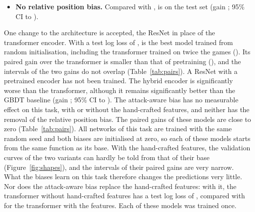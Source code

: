 \documentclass[11pt]{article}
\begin{document}
\begin{itemize}
 on the test
set (gain ; 95\% CI
 to
), and the
modification is
.
\fi
\ifchangegeometry
\item \textbf{No relative position bias.} Compared with
,
 is
on the test set (gain
;
95\% CI
to
).
\fi
\end{itemize}

\ifchangeconv
One change to the architecture is accepted, the ResNet in place of the
transformer encoder. With a test log loss of ,
 is the best model trained from random
initialisation\ifmore, including the transformer trained on twice the games
()\fi.\ifchangestart{} Its paired
gain over the transformer is smaller than that of pretraining
(),
and the intervals of the two gains do not overlap (Table~\ref{tab:pairs}). A
ResNet with a pretrained encoder has not been trained.\fi
\fi
\ifchangehybrid{}
The hybrid encoder is significantly worse than the transformer, although it
remains significantly better than the GBDT baseline (gain
; 95\% CI 
to ).
\fi
\ifchangeattacks
The attack-aware bias has no measurable effect on this task, with or without
the hand-crafted features\ifchangegeometry, and neither has the removal of
the relative position bias\fi. The paired gains of these models are close to
zero (Table~\ref{tab:pairs}). All networks of this task are trained with the
same random seed and both biases are initialised at zero, so each of these models starts
from the same function as its base. With the hand-crafted features, the
validation curves of the two variants can hardly be told from that of their
base (Figure~\ref{fig:shapes}), and the intervals of their paired gains are
very narrow. What the biases learn on this task therefore changes the
predictions very little. Nor does the attack-aware bias replace the hand-crafted
features: with it, the transformer without hand-crafted features has a test
log loss of , compared with
 for the transformer with the features.
\fi
Each of these models was trained once.
\fi
\end{document}
